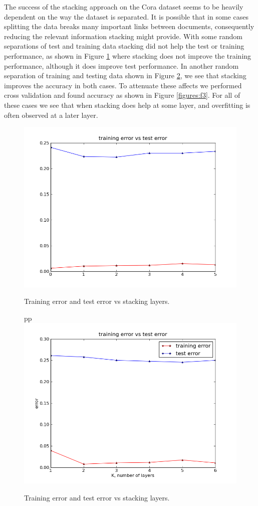 \documentclass[a4paper,11pt]{article}
\begin{document}
The success of the stacking approach on the Cora dataset seems to be heavily
dependent on the way the dataset is separated. It is possible that in some 
cases splitting the data breaks many important links between documents,
consequently reducing the relevant information stacking might provide. 
With some random separations of test and training data stacking did not help
the test or training performance, as shown in Figure \ref{figures:f1} where
stacking does not improve the training performance, although it does improve
test performance. In another random separation of training and testing data 
shown in Figure \ref{figures:f2}, we see that stacking improves the accuracy 
in both cases. To attenuate these affects we performed cross validation and 
found accuracy as shown in Figure \ref{figures:f3}. For all of these cases we 
see that when stacking does help at some layer, and overfitting is often observed at a later layer.

\begin{figure}[!ht]
  \caption{Training error and test error vs stacking layers.}
  \centering
  \includegraphics[width=4.5in]{WU5/trainingvstestD3R.png}
  \label{figures:f1}
\end{figure}

\newpage

\begin{figure}[!ht]
  \caption{Training error and test error vs stacking layers.}
pp  \centering
  \includegraphics[width=4.5in]{WU5/trainingvstestD2R.png}
  \label{figures:f2}
\end{figure}
\end{document}
